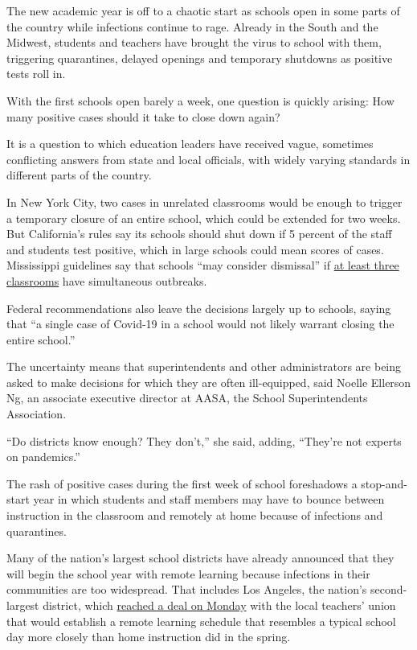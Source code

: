 The new academic year is off to a chaotic start as schools open in some
parts of the country while infections continue to rage. Already in the
South and the Midwest, students and teachers have brought the virus to
school with them, triggering quarantines, delayed openings and temporary
shutdowns as positive tests roll in.

With the first schools open barely a week, one question is quickly
arising: How many positive cases should it take to close down again?

It is a question to which education leaders have received vague,
sometimes conflicting answers from state and local officials, with
widely varying standards in different parts of the country.

In New York City, two cases in unrelated classrooms would be enough to
trigger a temporary closure of an entire school, which could be extended
for two weeks. But California's rules say its schools should shut down
if 5 percent of the staff and students test positive, which in large
schools could mean scores of cases. Mississippi guidelines say that
schools ``may consider dismissal'' if
\href{https://msachieves.mdek12.org/wp-content/uploads/2020/07/MSDH-Guidelines-for-K-12-Reopening-During-COVID-19.pdf}{at
least three classrooms} have simultaneous outbreaks.

Federal recommendations also leave the decisions largely up to schools,
saying that ``a single case of Covid-19 in a school would not likely
warrant closing the entire school.''

The uncertainty means that superintendents and other administrators are
being asked to make decisions for which they are often ill-equipped,
said Noelle Ellerson Ng, an associate executive director at AASA, the
School Superintendents Association.

``Do districts know enough? They don't,'' she said, adding, ``They're
not experts on pandemics.''

The rash of positive cases during the first week of school foreshadows a
stop-and-start year in which students and staff members may have to
bounce between instruction in the classroom and remotely at home because
of infections and quarantines.

Many of the nation's largest school districts have already announced
that they will begin the school year with remote learning because
infections in their communities are too widespread. That includes Los
Angeles, the nation's second-largest district, which
\href{https://www.latimes.com/california/story/2020-08-03/lausd-teachers-reach-tentative-online-learning-pact}{reached
a deal on Monday} with the local teachers' union that would establish a
remote learning schedule that resembles a typical school day more
closely than home instruction did in the spring.

